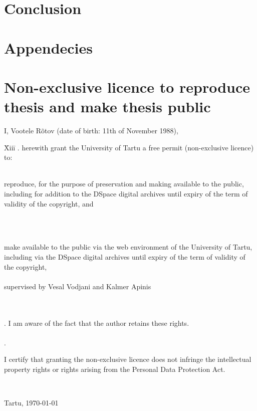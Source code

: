 \documentclass{style/master-thesis}
\begin{document}
\pagebreak


\clearpage
\section{Conclusion} 



\newpage

{}


\newpage

\appendix
\section*{Appendecies}
\renewcommand{\thesubsection}{\Alph{subsection}}

\pagebreak
\section*{\small Non-exclusive licence to reproduce thesis and make thesis public}


I, Vootele Rõtov (date of birth: 11th of November 1988),

\begin{tabbing}
\= Xiii\=\kill
{}. \> herewith grant the University of Tartu a free permit (non-exclusive licence) to:\\\\ 

\> 
\begin{minipage}[t]{14.2cm}
reproduce, for the purpose of preservation and making available to the public, including for addition to the DSpace digital archives until expiry of the term of validity of the copyright, and
\end{minipage}
\\\\
\begin{minipage}[t]{14.2cm}
make available to the public via the web environment of the University of Tartu, including via the DSpace digital archives until expiry of the term of validity of the copyright,\\ 

\articleName\\   

supervised by Vesal Vodjani and Kalmer Apinis

\end{minipage}\\\\ 
. \>I am aware of the fact that the author retains these rights.\\\\
. \>
\begin{minipage}[t]{14.2cm}
I certify that granting the non-exclusive licence does not infringe the intellectual property rights or rights arising from the Personal Data Protection Act. 
\end{minipage}\\
\end{tabbing}

\noindent
Tartu, \today
\end{document}
